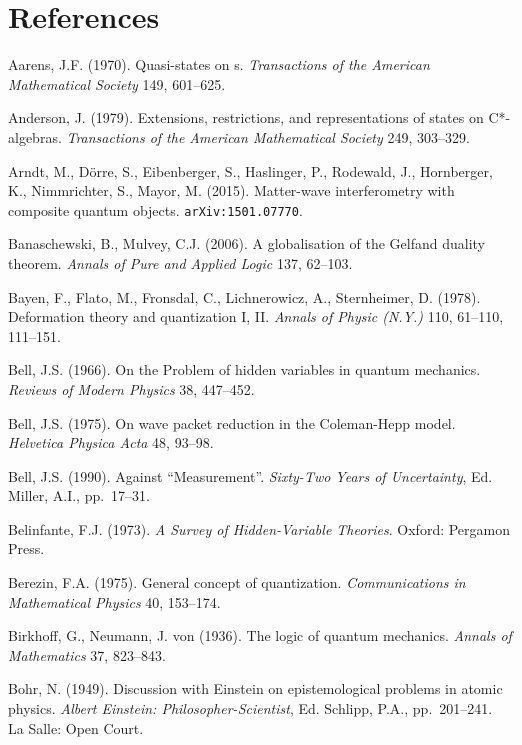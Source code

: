 \documentclass[12pt]{article}
\begin{document}
\section*{References}  
\begin{footnotesize}
\begin{trivlist}
\item  Aarens, J.F. (1970).  Quasi-states on \ca s. \emph{Transactions of the American Mathematical Society} 149, 601--625.
 \item Anderson, J. (1979). Extensions, restrictions, and representations of states on C*-algebras.
\emph{Transactions of the American Mathematical Society} 249, 303--329. 
\item  Arndt, M., D\"{o}rre, S.,  Eibenberger, S., Haslinger, P.,  Rodewald, J.,  Hornberger, K.,  Nimmrichter, S.,  Mayor, M. (2015).
Matter-wave interferometry with composite quantum objects. \texttt{arXiv:1501.07770}.
\item  Banaschewski, B., Mulvey,  C.J. (2006). 
A globalisation of the {G}elfand duality theorem. \emph{ Annals of Pure and Applied Logic} 137, 62--103. 
\item Bayen, F., Flato, M., Fronsdal, C.,  Lichnerowicz, A., 
Sternheimer, D.  (1978).  Deformation theory and quantization I, II.  \emph{Annals of  Physic (N.Y.)} 110, 61--110, 111--151.
 \item 
Bell, J.S. (1966).   On the Problem of hidden variables in quantum mechanics.
 \emph{Reviews of Modern Physics} 38, 447--452.
  \item 
Bell, J.S. (1975). 
On wave packet reduction in the Coleman-Hepp model. \emph{Helvetica Physica Acta} 48, 93--98.
\item Bell, J.S. (1990). Against ``Measurement''.  \emph{Sixty-Two Years of Uncertainty}, Ed. Miller, A.I., pp.\ 17--31.
 \item Belinfante, F.J. (1973). \emph{A Survey of Hidden-Variable Theories}. Oxford: Pergamon Press.
 \item
Berezin, F.A. (1975). General concept of quantization.  \emph{Communications in
Mathematical Physics}  40, 153--174.
\item
 Birkhoff,  G., Neumann,   J. von (1936).
The logic of quantum mechanics. \emph{Annals of Mathematics} {37},  823--843.
\item Bohr, N. (1949). Discussion with Einstein on epistemological problems in atomic physics. \emph{Albert Einstein: Philosopher-Scientist},  Ed. Schlipp, P.A.,  pp.\ 201--241.  La Salle: Open Court. 

\end{trivlist}
\end{footnotesize}
\end{document}
